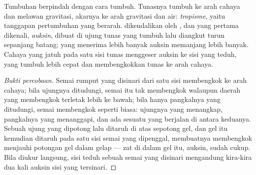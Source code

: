\begin{proposition}\label{prop:g12:plant-rooted-life:tropisms}
Tumbuhan berpindah dengan cara tumbuh. Tunasnya tumbuh ke arah cahaya
dan melawan gravitasi, akarnya ke arah gravitasi dan air:
\emph{tropisme}, yaitu tanggapan pertumbuhan yang
berarah.  dikendalikan oleh , dan  yang pertama
dikenali, \emph{auksin}, dibuat di ujung tunas yang tumbuh lalu
diangkut turun sepanjang batang;  yang menerima lebih banyak auksin
memanjang lebih banyak. Cahaya yang jatuh pada satu sisi tunas
menggeser auksin ke sisi yang teduh, yang tumbuh lebih cepat dan
membengkokkan tunas ke arah cahaya.
\end{proposition}
\begin{proof}[Bukti percobaan]
Semai rumput yang disinari dari satu sisi membengkok ke arah cahaya;
bila ujungnya ditudungi, semai itu tak membengkok walaupun daerah yang
membengkok terletak lebih ke bawah; bila hanya pangkalnya yang
ditudungi, semai membengkok seperti biasa: ujungnya yang menangkap,
pangkalnya yang menanggapi, dan ada sesuatu yang berjalan di antara
keduanya. Sebuah ujung yang dipotong lalu ditaruh di atas sepotong
gel, dan gel itu kemudian ditaruh pada satu sisi semai yang
dipenggal, membuatnya membengkok menjauhi potongan gel dalam gelap ---
zat di dalam gel itu, auksin, sudah cukup. Bila diukur langsung, sisi
teduh sebuah semai yang disinari mengandung kira-kira dua kali auksin
sisi yang tersinari.
\end{proof}

